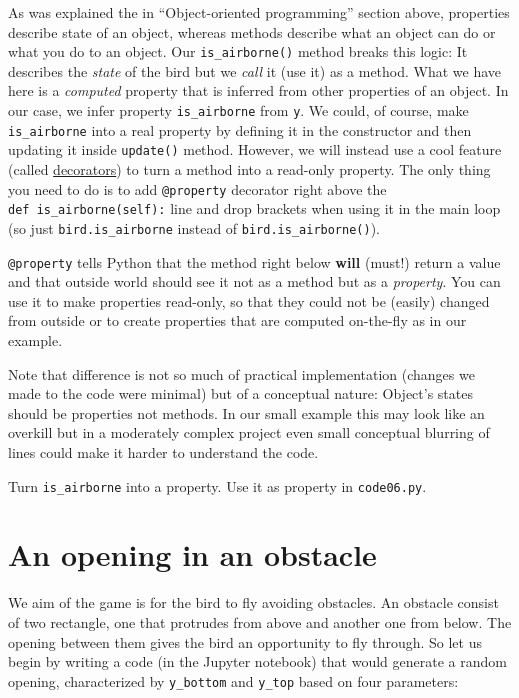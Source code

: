 \documentclass[
]{book}
\begin{document}
As was explained the in ``Object-oriented programming'' section above, properties describe state of an object, whereas methods describe what an object can do or what you do to an object. Our \texttt{is\_airborne()} method breaks this logic: It describes the \emph{state} of the bird but we \emph{call} it (use it) as a method. What we have here is a \emph{computed} property that is inferred from other properties of an object. In our case, we infer property \texttt{is\_airborne} from \texttt{y}. We could, of course, make \texttt{is\_airborne} into a real property by defining it in the constructor and then updating it inside \texttt{update()} method. However, we will instead use a cool feature (called \href{https://www.python.org/dev/peps/pep-0318/}{decorators}) to turn a method into a read-only property. The only thing you need to do is to add \texttt{@property} decorator right above the \texttt{def\ is\_airborne(self):} line and drop brackets when using it in the main loop (so just \texttt{bird.is\_airborne} instead of \texttt{bird.is\_airborne()}).

\texttt{@property} tells Python that the method right below \textbf{will} (must!) return a value and that outside world should see it not as a method but as a \emph{property}. You can use it to make properties read-only, so that they could not be (easily) changed from outside or to create properties that are computed on-the-fly as in our example.

Note that difference is not so much of practical implementation (changes we made to the code were minimal) but of a conceptual nature: Object's states should be properties not methods. In our small example this may look like an overkill but in a moderately complex project even small conceptual blurring of lines could make it harder to understand the code.

Turn \texttt{is\_airborne} into a property.
Use it as property in \texttt{code06.py}.

\hypertarget{an-opening-in-an-obstacle}{%
\section{An opening in an obstacle}\label{an-opening-in-an-obstacle}}

We aim of the game is for the bird to fly avoiding obstacles. An obstacle consist of two rectangle, one that protrudes from above and another one from below. The opening between them gives the bird an opportunity to fly through. So let us begin by writing a code (in the Jupyter notebook) that would generate a random opening, characterized by \texttt{y\_bottom} and \texttt{y\_top} based on four parameters:
\end{document}
